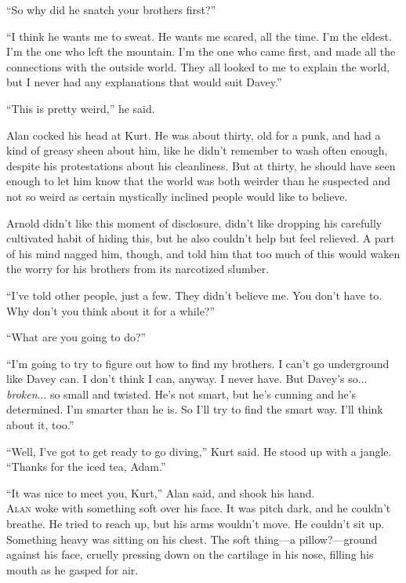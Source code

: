 \documentclass{article}
\begin{document}
``So why did he snatch your brothers first?''

``I think he wants me to sweat.  He wants me scared, all the time. 
I'm the eldest.  I'm the one who left the mountain.  I'm the one who
came first, and made all the connections with the outside world.  They
all looked to me to explain the world, but I never had any
explanations that would suit Davey.''

``This is pretty weird,'' he said.

Alan cocked his head at Kurt.  He was about thirty, old for a punk,
and had a kind of greasy sheen about him, like he didn't remember to
wash often enough, despite his protestations about his cleanliness. 
But at thirty, he should have seen enough to let him know that the
world was both weirder than he suspected and not so weird as certain
mystically inclined people would like to believe.

Arnold didn't like this moment of disclosure, didn't like dropping his
carefully cultivated habit of hiding this, but he also couldn't help
but feel relieved.  A part of his mind nagged him, though, and told
him that too much of this would waken the worry for his brothers from
its narcotized slumber.

``I've told other people, just a few.  They didn't believe me.  You
don't have to.  Why don't you think about it for a while?''

``What are you going to do?''

``I'm going to try to figure out how to find my brothers.  I can't go
underground like Davey can.  I don't think I can, anyway.  I never
have.  But Davey's so...  \textit{broken}...  so small and twisted. 
He's not smart, but he's cunning and he's determined.  I'm smarter
than he is.  So I'll try to find the smart way.  I'll think about it,
too.''

``Well, I've got to get ready to go diving,'' Kurt said.  He stood up
with a jangle.  ``Thanks for the iced tea, Adam.''

``It was nice to meet you, Kurt,'' Alan said, and shook his hand.
\\
\lettrine[lines=3, lhang=.5, nindent=0pt, findent=2pt]{A}{lan} woke with something soft over his face.  It was pitch dark, and
he couldn't breathe.  He tried to reach up, but his arms wouldn't
move.  He couldn't sit up.  Something heavy was sitting on his chest. 
The soft thing---a pillow?---ground against his face, cruelly pressing
down on the cartilage in his nose, filling his mouth as he gasped for
air.
\end{document}
